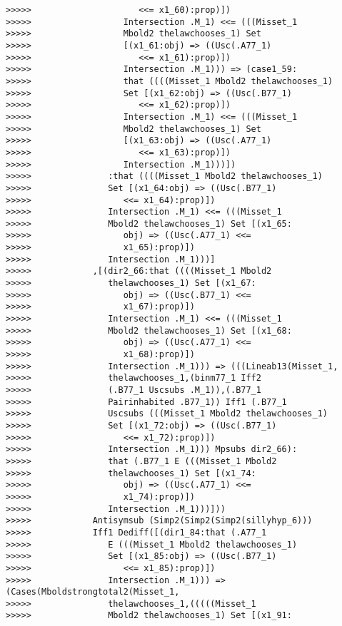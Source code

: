 \documentclass[12pt]{article}
\begin{document}
\begin{verbatim}
>>>>>                     <<= x1_60):prop)])
>>>>>                  Intersection .M_1) <<= (((Misset_1
>>>>>                  Mbold2 thelawchooses_1) Set
>>>>>                  [(x1_61:obj) => ((Usc(.A77_1)
>>>>>                     <<= x1_61):prop)])
>>>>>                  Intersection .M_1))) => (case1_59:
>>>>>                  that ((((Misset_1 Mbold2 thelawchooses_1)
>>>>>                  Set [(x1_62:obj) => ((Usc(.B77_1)
>>>>>                     <<= x1_62):prop)])
>>>>>                  Intersection .M_1) <<= (((Misset_1
>>>>>                  Mbold2 thelawchooses_1) Set
>>>>>                  [(x1_63:obj) => ((Usc(.A77_1)
>>>>>                     <<= x1_63):prop)])
>>>>>                  Intersection .M_1)))])
>>>>>               :that ((((Misset_1 Mbold2 thelawchooses_1)
>>>>>               Set [(x1_64:obj) => ((Usc(.B77_1)
>>>>>                  <<= x1_64):prop)])
>>>>>               Intersection .M_1) <<= (((Misset_1
>>>>>               Mbold2 thelawchooses_1) Set [(x1_65:
>>>>>                  obj) => ((Usc(.A77_1) <<=
>>>>>                  x1_65):prop)])
>>>>>               Intersection .M_1)))]
>>>>>            ,[(dir2_66:that ((((Misset_1 Mbold2
>>>>>               thelawchooses_1) Set [(x1_67:
>>>>>                  obj) => ((Usc(.B77_1) <<=
>>>>>                  x1_67):prop)])
>>>>>               Intersection .M_1) <<= (((Misset_1
>>>>>               Mbold2 thelawchooses_1) Set [(x1_68:
>>>>>                  obj) => ((Usc(.A77_1) <<=
>>>>>                  x1_68):prop)])
>>>>>               Intersection .M_1))) => (((Lineab13(Misset_1,
>>>>>               thelawchooses_1,(binm77_1 Iff2
>>>>>               (.B77_1 Uscsubs .M_1)),(.B77_1
>>>>>               Pairinhabited .B77_1)) Iff1 (.B77_1
>>>>>               Uscsubs (((Misset_1 Mbold2 thelawchooses_1)
>>>>>               Set [(x1_72:obj) => ((Usc(.B77_1)
>>>>>                  <<= x1_72):prop)])
>>>>>               Intersection .M_1))) Mpsubs dir2_66):
>>>>>               that (.B77_1 E (((Misset_1 Mbold2
>>>>>               thelawchooses_1) Set [(x1_74:
>>>>>                  obj) => ((Usc(.A77_1) <<=
>>>>>                  x1_74):prop)])
>>>>>               Intersection .M_1)))]))
>>>>>            Antisymsub (Simp2(Simp2(Simp2(sillyhyp_6)))
>>>>>            Iff1 Dediff([(dir1_84:that (.A77_1
>>>>>               E (((Misset_1 Mbold2 thelawchooses_1)
>>>>>               Set [(x1_85:obj) => ((Usc(.B77_1)
>>>>>                  <<= x1_85):prop)])
>>>>>               Intersection .M_1))) => (Cases(Mboldstrongtotal2(Misset_1,
>>>>>               thelawchooses_1,(((((Misset_1
>>>>>               Mbold2 thelawchooses_1) Set [(x1_91:

\end{verbatim}
\end{document}

